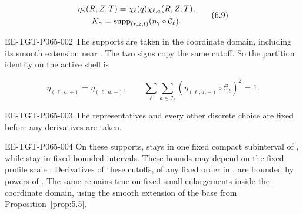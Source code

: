 \begin{equation}
\begin{gathered}
 \eta_\gamma(R,Z,T)=\chi_\ell(q)\chi_{\ell,a}(R,Z,T),\\
 K_\gamma=\operatorname{supp}_{(r,z,t)}(\eta_\gamma\circ\mathcal C_\ell).
\end{gathered}
 \tag{6.9}\label{eq:6.9}
\end{equation}
\begin{EESegment}{EE-TGT-P065-002}
The supports are taken in the coordinate domain, including its smooth extension near . The two signs copy the same cutoff. So the partition identity on the active shell is
\end{EESegment}
\[
 \eta_{(\ell,a,+)}=\eta_{(\ell,a,-)},
 \qquad
 \sum_\ell\sum_{a\in\mathcal I_\ell}(\eta_{(\ell,a,+)}\circ\mathcal C_\ell)^2=1.
\]
\begin{EESegment}{EE-TGT-P065-003}
The representatives and every other discrete choice are fixed before any derivatives are taken.
\end{EESegment}

\begin{EESegment}{EE-TGT-P065-004}
On these supports,  stays in one fixed compact subinterval of , while  stay in fixed bounded intervals. These bounds may depend on the fixed profile scale . Derivatives of these cutoffs, of any fixed order in , are bounded by powers of . The same remains true on fixed small enlargements inside the coordinate domain, using the smooth extension of the base from Proposition~\ref{prop:5.5}.
\end{EESegment}

